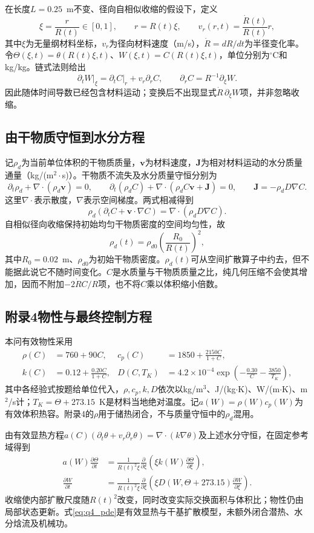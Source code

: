 \documentclass[withoutpreface]{cumcmthesis}
\begin{document}
在长度$L=0.25$~m不变、径向自相似收缩的假设下，定义
\[
\xi=\frac{r}{R(t)}\in[0,1],\qquad r=R(t)\xi,\qquad
v_r(r,t)=\frac{\dot R(t)}{R(t)}r,
\]
其中$\xi$为无量纲材料坐标，$v_r$为径向材料速度（m/s），$\dot R=dR/dt$为半径变化率。令$\Theta(\xi,t)=\theta(R(t)\xi,t)$、$W(\xi,t)=C(R(t)\xi,t)$，单位分别为$^\circ$C和kg/kg。链式法则给出
\[
\left.\partial_tW\right|_\xi=\left.\partial_tC\right|_r+v_r\partial_rC,
\qquad \partial_rC=R^{-1}\partial_\xi W.
\]
因此随体时间导数已经包含材料运动；变换后不出现显式$\dot R\,\partial_\xi W$项，并非忽略收缩。

\subsection{由干物质守恒到水分方程}
记$\rho_d$为当前单位体积的干物质质量，$\boldsymbol v$为材料速度，$\boldsymbol J$为相对材料运动的水分质量通量（kg/(m$^2\!\cdot$s)）。干物质不流失及水分质量守恒分别为
\[
\partial_t\rho_d+\nabla\!\cdot(\rho_d\boldsymbol v)=0,\qquad
\partial_t(\rho_d C)+\nabla\!\cdot(\rho_d C\boldsymbol v+\boldsymbol J)=0,
\qquad \boldsymbol J=-\rho_dD\nabla C.
\]
这里$\nabla\!\cdot$表示散度，$\nabla$表示空间梯度。两式相减得到
\[
\rho_d(\partial_tC+\boldsymbol v\!\cdot\nabla C)
=\nabla\!\cdot(\rho_dD\nabla C).
\]
自相似径向收缩保持初始均匀干物质密度的空间均匀性，故
\[
\rho_d(t)=\rho_{d0}\left(\frac{R_0}{R(t)}\right)^2,
\]
其中$R_0=0.02$~m、$\rho_{d0}$为初始干物质密度。$\rho_d(t)$可从空间扩散算子中约去，但不能据此说它不随时间变化。$C$是水质量与干物质质量之比，纯几何压缩不会使其增加，因而不附加$-2\dot R C/R$项，也不将$C$乘以体积缩小倍数。

\subsection{附录4物性与最终控制方程}
本问有效物性采用
\[
\begin{aligned}
\rho(C)&=760+90C,&c_p(C)&=1850+\frac{2150C}{1+C},\\
k(C)&=0.12+\frac{0.20C}{1+C},&
D(C,T_K)&=4.2\times10^{-4}\exp\!\left(-\frac{0.30}{C}-\frac{3850}{T_K}\right),
\end{aligned}
\]
其中各经验式按题给单位代入，$\rho,c_p,k,D$依次以kg/m$^3$、J/(kg$\cdot$K)、W/(m$\cdot$K)、m$^2$/s计；$T_K=\Theta+273.15$~K是材料当地绝对温度。记$a(W)=\rho(W)c_p(W)$为有效体积热容。附录4的$\rho$用于储热闭合，不与质量守恒中的$\rho_d$混用。

由有效显热方程$a(C)(\partial_t\theta+v_r\partial_r\theta)=\nabla\!\cdot(k\nabla\theta)$及上述水分守恒，在固定参考域得到
\begin{equation}\label{eq:q4_pde}
\boxed{\begin{aligned}
a(W)\frac{\partial\Theta}{\partial t}
&=\frac{1}{R(t)^2\xi}\frac{\partial}{\partial\xi}
\left(\xi k(W)\frac{\partial\Theta}{\partial\xi}\right),\\
\frac{\partial W}{\partial t}
&=\frac{1}{R(t)^2\xi}\frac{\partial}{\partial\xi}
\left(\xi D(W,\Theta+273.15)\frac{\partial W}{\partial\xi}\right).
\end{aligned}}
\end{equation}
收缩使内部扩散尺度随$R(t)^2$改变，同时改变实际交换面积与体积比；物性仍由局部状态更新。式\eqref{eq:q4_pde}是有效显热与干基扩散模型，未额外闭合潜热、水分焓流及机械功。
\end{document}

